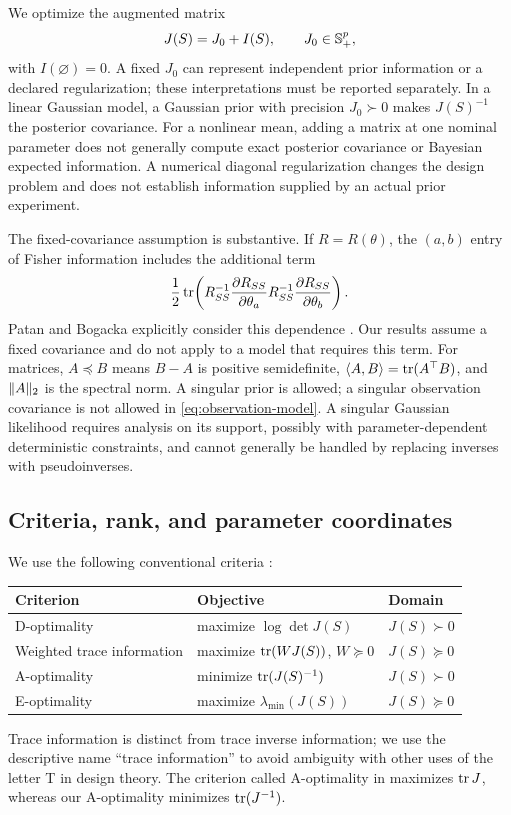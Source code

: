 We optimize the augmented matrix
\begin{equation}
 J(S)=J_0+I(S),\qquad J_0\in\mathbb S_+^p,
 \label{eq:augmented-information}
\end{equation}
with $I(\varnothing)=0$. A fixed $J_0$ can represent independent prior
information or a declared regularization; these interpretations must be
reported separately. In a linear Gaussian model, a Gaussian prior with
precision $J_0\succ0$ makes $J(S)^{-1}$ the posterior covariance. For a
nonlinear mean, adding a matrix at one nominal parameter does not generally
compute exact posterior covariance or Bayesian expected information.
A numerical diagonal regularization changes the design problem and does not
establish information supplied by an actual prior experiment.

The fixed-covariance assumption is substantive. If $R=R(\theta)$, the
$(a,b)$ entry of Fisher information includes the additional term
\begin{equation}
 \frac12\operatorname{tr}\!\left(R_{SS}^{-1}
 \frac{\partial R_{SS}}{\partial\theta_a}
 R_{SS}^{-1}\frac{\partial R_{SS}}{\partial\theta_b}\right).
 \label{eq:covariance-information}
\end{equation}
Patan and Bogacka explicitly consider this dependence \citep{Patan2007}.
Our results assume a fixed covariance and do not apply to a model that
requires this term.
For matrices, $A\preceq B$ means $B-A$ is positive semidefinite,
$\langle A,B\rangle=\operatorname{tr}(A^\top B)$, and $\lVert A\rVert_2$ is the spectral norm.
A singular prior is allowed; a singular observation covariance is not allowed
in \eqref{eq:observation-model}. A singular Gaussian likelihood requires
analysis on its support, possibly with parameter-dependent deterministic
constraints, and cannot generally be handled by replacing inverses with
pseudoinverses.

\subsection{Criteria, rank, and parameter coordinates}
\label{subsec:criteria}
We use the following conventional criteria \citep{Sagnol2015,Hainy2025}:
\begin{center}
\begin{tabular}{lll}
\toprule
Criterion & Objective & Domain\\
\midrule
D-optimality & maximize $\log\det J(S)$ & $J(S)\succ0$\\
Weighted trace information & maximize $\operatorname{tr}(WJ(S))$, $W\succeq0$ & $J(S)\succeq0$\\
A-optimality & minimize $\operatorname{tr}(J(S)^{-1})$ & $J(S)\succ0$\\
E-optimality & maximize $\lambda_{\min}(J(S))$ & $J(S)\succeq0$\\
\bottomrule
\end{tabular}
\end{center}
Trace information is distinct from trace inverse information; we use the
descriptive name ``trace information'' to avoid ambiguity with other uses
of the letter T in design theory. The criterion called A-optimality in
\citet{Wang2024} maximizes $\operatorname{tr} J$, whereas our A-optimality minimizes
$\operatorname{tr}(J^{-1})$.

